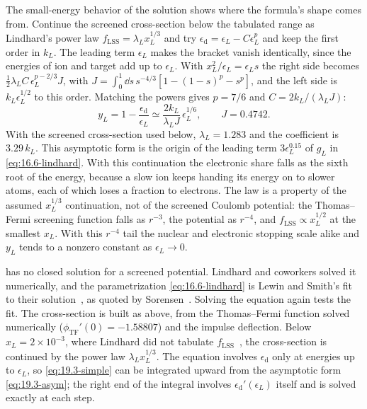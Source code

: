 The small-energy behavior of the solution shows where the formula's shape comes from. Continue the screened cross-section below the tabulated range as Lindhard's power law $f_{\mathrm{LSS}} = \lambda_Lx_L^{1/3}$ and try $\epsilon_{\mathrm{d}} = \epsilon_L - C\epsilon_L^p$ and keep the first order in $k_L$. The leading term $\epsilon_L$ makes the bracket vanish identically, since the energies of ion and target add up to $\epsilon_L$. With $x_L^2/\epsilon_L = \epsilon_Ls$ the right side becomes $\tfrac12\lambda_LC\,\epsilon_L^{p - 2/3}J$, with $J = \int_0^1\dd s\,s^{-4/3}[1 - (1 - s)^p - s^p]$, and the left side is $k_L\epsilon_L^{1/2}$ to this order. Matching the powers gives $p = 7/6$ and $C = 2k_L/(\lambda_LJ)$:
\begin{equation}
  y_L = 1 - \frac{\epsilon_{\mathrm{d}}}{\epsilon_L} \simeq \frac{2k_L}{\lambda_LJ}\,\epsilon_L^{1/6} , \qquad J = 0.4742 .
  \label{eq:19.3-asym}
\end{equation}
With the screened cross-section used below, $\lambda_L = 1.283$ and the coefficient is $3.29\,k_L$. This asymptotic form is the origin of the leading term $3\epsilon_L^{0.15}$ of $g_L$ in \cref{eq:16.6-lindhard}. With this continuation the electronic share falls as the sixth root of the energy, because a slow ion keeps handing its energy on to slower atoms, each of which loses a fraction to electrons. The law is a property of the assumed $x_L^{1/3}$ continuation, not of the screened Coulomb potential: the Thomas--Fermi screening function falls as $r^{-3}$, the potential as $r^{-4}$, and $f_{\mathrm{LSS}} \propto x_L^{1/2}$ at the smallest $x_L$. With this $r^{-4}$ tail the nuclear and electronic stopping scale alike and $y_L$ tends to a nonzero constant as $\epsilon_L \to 0$.

 has no closed solution for a screened potential. Lindhard and coworkers solved it numerically, and the parametrization \cref{eq:16.6-lindhard} is Lewin and Smith's fit to their solution~\cite{lewin1996review}, as quoted by Sorensen~\cite[Eqs.~(5)--(7)]{sorensen2015atomic}. Solving the equation again tests the fit. The cross-section is built as above, from the Thomas--Fermi function solved numerically ($\phi_{\mathrm{TF}}'(0) = -1.58807$) and the impulse deflection. Below $x_L = 2\times10^{-3}$, where Lindhard did not tabulate $f_{\mathrm{LSS}}$~\cite[Sect.~II\,D]{sorensen2015atomic}, the cross-section is continued by the power law $\lambda_Lx_L^{1/3}$. The equation involves $\epsilon_{\mathrm{d}}$ only at energies up to $\epsilon_L$, so \cref{eq:19.3-simple} can be integrated upward from the asymptotic form \cref{eq:19.3-asym}; the right end of the integral involves $\epsilon_{\mathrm{d}}'(\epsilon_L)$ itself and is solved exactly at each step.

